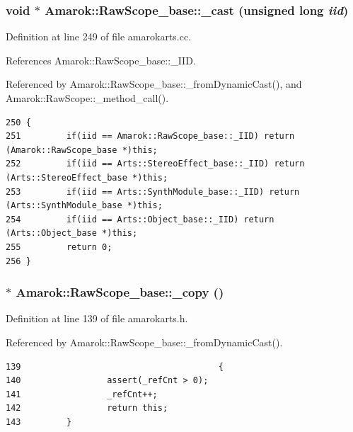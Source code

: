 \subsubsection{\setlength{\rightskip}{0pt plus 5cm}void $\ast$ Amarok::Raw\-Scope\_\-base::\_\-cast (unsigned long {\em iid})\hspace{0.3cm}{\tt  [inherited]}}\label{classAmarok_1_1RawScope__base_Amarok_1_1RawScope__stuba7}




Definition at line 249 of file amarokarts.cc.

References Amarok::Raw\-Scope\_\-base::\_\-IID.

Referenced by Amarok::Raw\-Scope\_\-base::\_\-from\-Dynamic\-Cast(), and Amarok::Raw\-Scope::\_\-method\_\-call().



\footnotesize\begin{verbatim}250 {
251         if(iid == Amarok::RawScope_base::_IID) return (Amarok::RawScope_base *)this;
252         if(iid == Arts::StereoEffect_base::_IID) return (Arts::StereoEffect_base *)this;
253         if(iid == Arts::SynthModule_base::_IID) return (Arts::SynthModule_base *)this;
254         if(iid == Arts::Object_base::_IID) return (Arts::Object_base *)this;
255         return 0;
256 }
\end{verbatim}\normalsize 
{}
\subsubsection{$\ast$ Amarok::Raw\-Scope\_\-base::\_\-copy ()\hspace{0.3cm}{\tt  [inline, inherited]}}\label{classAmarok_1_1RawScope__base_Amarok_1_1RawScope__stuba4}




Definition at line 139 of file amarokarts.h.

Referenced by Amarok::Raw\-Scope\_\-base::\_\-from\-Dynamic\-Cast().



\footnotesize\begin{verbatim}139                                       {
140                 assert(_refCnt > 0);
141                 _refCnt++;
142                 return this;
143         }
\end{verbatim}\normalsize 
{}
